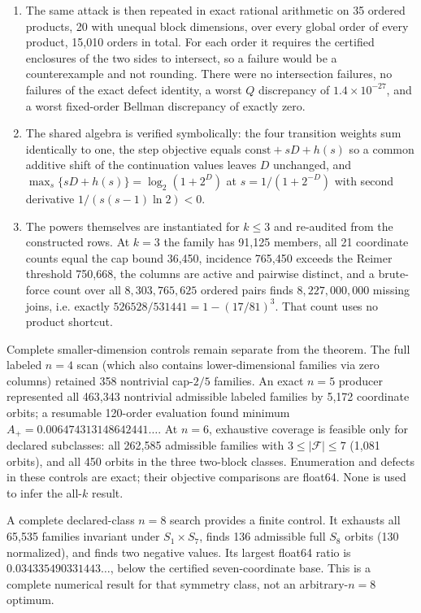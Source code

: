 \documentclass[11pt]{article}
\theoremstyle{remark}
\newcommand{\F}{\mathcal F}
\begin{document}
\begin{enumerate}
columns, singletons, full power sets, middle layers, and seeded random pairs,
over every global order of each product.  It found no counterexample; the worst
gap is $1.8\times10^{-15}$ and the exact ordered-defect product never failed.
\item The same attack is then repeated in exact rational arithmetic on 35
ordered products, 20 with unequal block dimensions, over every global order of
every product, 15,010 orders in total.  For each order it requires the
certified enclosures of the two sides to intersect, so a failure would be a
counterexample and not rounding.  There were no intersection failures, no
failures of the exact defect identity, a worst $Q$ discrepancy of
$1.4\times10^{-27}$, and a worst fixed-order Bellman discrepancy of exactly
zero.
\item The shared algebra is verified symbolically: the four transition weights
sum identically to one, the step objective equals
$\text{const}+sD+h(s)$ so a common additive shift of the continuation values
leaves $D$ unchanged, and
$\max_s\{sD+h(s)\}=\log_2(1+2^D)$ at $s=1/(1+2^{-D})$ with second derivative
$1/(s(s-1)\ln2)<0$.
\item The powers themselves are instantiated for $k\le3$ and re-audited from
the constructed rows.  At $k=3$ the family has 91,125 members, all 21
coordinate counts equal the cap bound 36,450, incidence 765,450 exceeds the
Reimer threshold 750,668, the columns are active and pairwise distinct, and a
brute-force count over all $8{,}303{,}765{,}625$ ordered pairs finds
$8{,}227{,}000{,}000$ missing joins, i.e. exactly
$526528/531441=1-(17/81)^3$.  That count uses no product shortcut.
\end{enumerate}

Complete smaller-dimension controls remain separate from the theorem.  The
full labeled $n=4$ scan (which also contains lower-dimensional families via
zero columns) retained 358 nontrivial cap-$2/5$ families.  An exact $n=5$
producer represented all 463,343 nontrivial admissible labeled families by
5,172 coordinate orbits; a resumable 120-order evaluation found minimum
$A_+=0.006474313148642441\ldots$.  At $n=6$, exhaustive coverage is feasible
only for declared subclasses: all 262,585 admissible families with
$3\le|\F|\le7$ (1,081 orbits), and all 450 orbits in the three two-block
classes.  Enumeration and defects in these controls are exact; their objective
comparisons are float64.  None is used to infer the all-$k$ result.

A complete declared-class $n=8$ search provides a finite control.  It exhausts
all 65,535 families invariant under $S_1\times S_7$, finds 136 admissible full
$S_8$ orbits (130 normalized), and finds two negative values.  Its largest
float64 ratio is $0.034335490331443\ldots$, below the certified seven-coordinate
base.  This is a complete numerical result for that symmetry class, not an
arbitrary-$n=8$ optimum.
\end{document}
